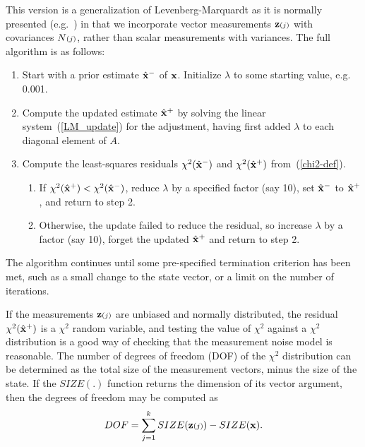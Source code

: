 \documentclass{article}
\begin{document}
This version is a generalization
of Levenberg-Marquardt as it is normally presented
(e.g.~\cite{Press:etal:88}) in that we incorporate vector measurements
${\bf z}{\scriptstyle (j)}$ with covariances $N{\scriptstyle (j)}$, rather than scalar measurements
with variances. The full algorithm is as follows:
\begin{enumerate}
 \item Start with a prior estimate $\hat{\bf x}^-$ of ${\bf x}$. Initialize $\lambda$
        to some starting value, e.g. 0.001.
 \item Compute the updated estimate $\hat{\bf x}^+$ by solving the linear
        system~(\ref{LM_update}) for the adjustment, having first added
        $\lambda$ to each diagonal element of $A$.
 \item Compute the least-squares residuals $\chi^2(\hat{\bf x}^-)$ and $\chi^2(\hat{\bf x}^+)$
        from~(\ref{chi2-def}).
 \begin{enumerate}
  \item If $\chi^2(\hat{\bf x}^+)<\chi^2(\hat{\bf x}^-)$, reduce $\lambda$ by a specified factor
        (say 10), set $\hat{\bf x}^-$ to $\hat{\bf x}^+$, and return to step 2.
  \item Otherwise, the update failed to reduce the residual, so increase
        $\lambda$ by a factor (say 10), forget the updated $\hat{\bf x}^+$ and
        return to step 2.
 \end{enumerate}
\end{enumerate}
The algorithm continues until some pre-specified termination criterion
has been met, such as a small change to the state vector, or a limit on
the number of iterations.

If the measurements ${\bf z}{\scriptstyle (j)}$ are unbiased and normally distributed,
the residual $\chi^2(\hat{\bf x}^+)$ is a $\chi^2$ random variable, and testing
the value of $\chi^2$ against a $\chi^2$ distribution is a good way
of checking that the measurement noise model is reasonable.
The number of degrees of freedom (DOF) of the $\chi^2$ distribution
can be determined as the total size of the measurement vectors,
minus the size of the state.
If the $SIZE(.)$ function returns the dimension of its vector
argument, then the degrees of freedom may be computed as
\begin{equation}
 DOF = \sum_{j=1}^k SIZE({\bf z}{\scriptstyle (j)}) - SIZE({\bf x}).
 \label{LM_DOF}
\end{equation}
\end{document}
